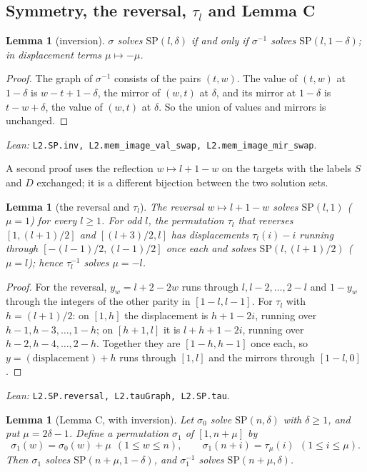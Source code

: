 \documentclass[11pt]{amsart}
\theoremstyle{plain}
\newtheorem{lemma}[theorem]{Lemma}
\theoremstyle{definition}
\theoremstyle{remark}
\newcommand{\SP}{\mathrm{SP}}
\newcommand{\lean}[1]{\par\smallskip
  {\small\raggedright\noindent\textit{Lean:} \texttt{#1}.\par}\smallskip}
\begin{document}
\subsection*{Symmetry, the reversal, \texorpdfstring{$\tau_l$}{tau} and Lemma C}

\begin{lemma}[inversion]\label{lem:inv}
$\sigma$ solves $\SP(l,\delta)$ if and only if $\sigma^{-1}$ solves $\SP(l,1-\delta)$;
in displacement terms $\mu \mapsto -\mu$.
\end{lemma}

\begin{proof}
The graph of $\sigma^{-1}$ consists of the pairs $(t,w)$. The value of $(t,w)$ at
$1-\delta$ is $w-t+1-\delta$, the mirror of $(w,t)$ at $\delta$, and its mirror at
$1-\delta$ is $t-w+\delta$, the value of $(w,t)$ at $\delta$. So the union of values and
mirrors is unchanged.
\end{proof}
\lean{L2.SP.inv, L2.mem\_image\_val\_swap, L2.mem\_image\_mir\_swap}

A second proof uses the reflection $w \mapsto l+1-w$ on the targets with the labels
$S$ and $D$ exchanged; it is a different bijection between the two solution sets.

\begin{lemma}[the reversal and $\tau_l$]\label{lem:rev}
The reversal $w \mapsto l+1-w$ solves $\SP(l,1)$ ($\mu = 1$) for every $l \ge 1$. For
odd $l$, the permutation $\tau_l$ that reverses $[1,(l+1)/2]$ and $[(l+3)/2,l]$ has
displacements $\tau_l(i) - i$ running through $[-(l-1)/2,(l-1)/2]$ once each and solves
$\SP(l,(l+1)/2)$ ($\mu = l$); hence $\tau_l^{-1}$ solves $\mu = -l$.
\end{lemma}

\begin{proof}
For the reversal, $y_w = l+2-2w$ runs through $l, l-2, \dots, 2-l$ and $1-y_w$ through
the integers of the other parity in $[1-l,l-1]$. For $\tau_l$ with $h = (l+1)/2$: on
$[1,h]$ the displacement is $h+1-2i$, running over $h-1, h-3, \dots, 1-h$; on
$[h+1,l]$ it is $l+h+1-2i$, running over $h-2, h-4, \dots, 2-h$. Together they are
$[1-h,h-1]$ once each, so $y = (\text{displacement}) + h$ runs through $[1,l]$ and the
mirrors through $[1-l,0]$.
\end{proof}
\lean{L2.SP.reversal, L2.tauGraph, L2.SP.tau}

\begin{lemma}[Lemma C, with inversion]\label{lem:C}
Let $\sigma_0$ solve $\SP(n,\delta)$ with $\delta \ge 1$, and put $\mu = 2\delta-1$.
Define a permutation $\sigma_1$ of $[1,n+\mu]$ by
\[
  \sigma_1(w) = \sigma_0(w) + \mu \ \ (1 \le w \le n), \qquad
  \sigma_1(n+i) = \tau_\mu(i) \ \ (1 \le i \le \mu).
\]
Then $\sigma_1$ solves $\SP(n+\mu, 1-\delta)$, and $\sigma_1^{-1}$ solves
$\SP(n+\mu,\delta)$.
\end{lemma}
\end{document}
